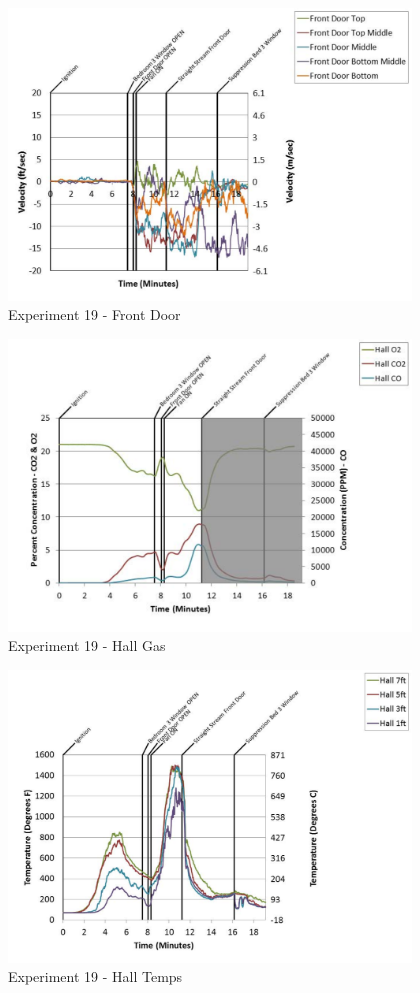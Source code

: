 \documentclass{article}
\begin{document}
\begin{appendices}
	\begin{figure}[h!]
		\centering
		\includegraphics[height=3.05in]{0_Images/Results_Charts/Exp_19_Charts/FrontDoor.pdf}
		\caption{Experiment 19 - Front Door}
	\end{figure}
 
	\clearpage

	\begin{figure}[h!]
		\centering
		\includegraphics[height=3.05in]{0_Images/Results_Charts/Exp_19_Charts/HallGas.pdf}
		\caption{Experiment 19 - Hall Gas}
	\end{figure}
 

	\begin{figure}[h!]
		\centering
		\includegraphics[height=3.05in]{0_Images/Results_Charts/Exp_19_Charts/HallTemps.pdf}
		\caption{Experiment 19 - Hall Temps}
	\end{figure}
 

\end{appendices}
\end{document}

